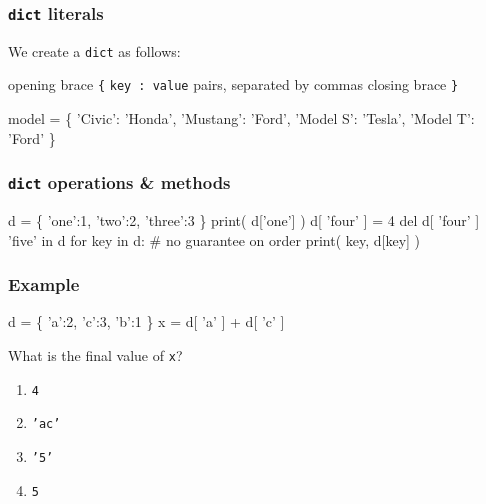 \documentclass[11pt]{beamer}
\begin{document}
\begin{frame}[fragile]
  \frametitle{\texttt{dict} literals}
  \Enlarge

  \begin{itemize}
  \myitem  We create a \texttt{dict} as follows:
    \begin{itemize}
    \mysubitem  opening brace \texttt{\{}
    \mysubitem  \texttt{key : value} pairs, separated by commas
    \mysubitem  closing brace \texttt{\}}
    \end{itemize}
  \end{itemize}
  \begin{semiverbatim}
model = \{
  'Civic': 'Honda',
  'Mustang': 'Ford',
  'Model S': 'Tesla',
  'Model T': 'Ford'
\}
  \end{semiverbatim}
\end{frame}

\begin{frame}[fragile]
  \frametitle{\texttt{dict} operations \& methods}
  \Enlarge

  \begin{semiverbatim}
d = \{ 'one':1, 'two':2, 'three':3 \}
print( d['one'] )
d[ 'four' ] = 4
del d[ 'four' ]
'five' in d
for key in d:  # no guarantee on order
    print( key, d[key] )
  \end{semiverbatim}
\end{frame}

\begin{frame}[fragile]
  \frametitle{Example}
  \Enlarge

  \begin{semiverbatim}
d = \{ 'a':2, 'c':3, 'b':1 \}
x = d[ 'a' ] + d[ 'c' ]
  \end{semiverbatim}
  What is the final value of \texttt{x}?
  \begin{enumerate}[label=\Alph*]
  \item  \texttt{4}
  \item  \texttt{'ac'}
  \item  \texttt{'5'}
  \item  \texttt{5}
  \end{enumerate}
\end{frame}
\end{document}
